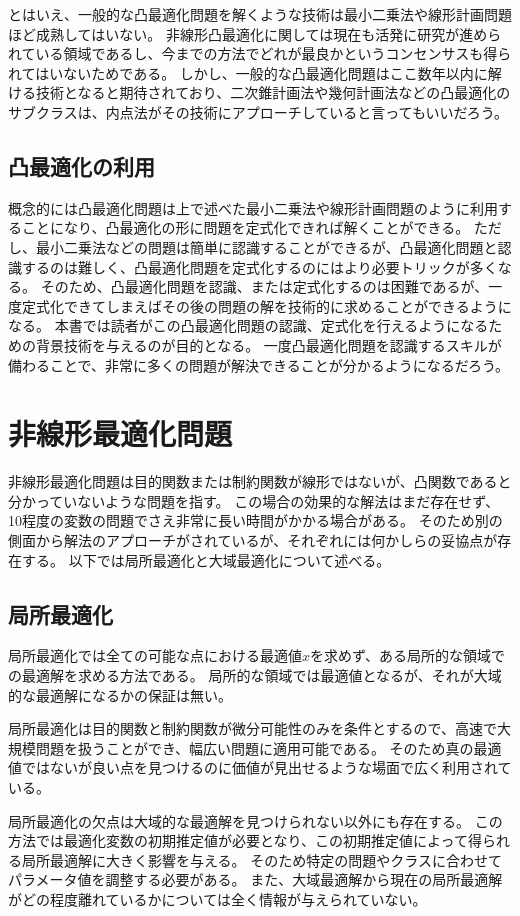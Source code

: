 \documentclass[a4paper, 10pt, uplatex]{jsreport}
\begin{document}
とはいえ、一般的な凸最適化問題を解くような技術は最小二乗法や線形計画問題ほど成熟してはいない。
非線形凸最適化に関しては現在も活発に研究が進められている領域であるし、今までの方法でどれが最良かというコンセンサスも得られてはいないためである。
しかし、一般的な凸最適化問題はここ数年以内に解ける技術となると期待されており、二次錐計画法や幾何計画法などの凸最適化のサブクラスは、内点法がその技術にアプローチしていると言ってもいいだろう。

\subsection{凸最適化の利用}
概念的には凸最適化問題は上で述べた最小二乗法や線形計画問題のように利用することになり、凸最適化の形に問題を定式化できれば解くことができる。
ただし、最小二乗法などの問題は簡単に認識することができるが、凸最適化問題と認識するのは難しく、凸最適化問題を定式化するのにはより必要トリックが多くなる。
そのため、凸最適化問題を認識、または定式化するのは困難であるが、一度定式化できてしまえばその後の問題の解を技術的に求めることができるようになる。
本書では読者がこの凸最適化問題の認識、定式化を行えるようになるための背景技術を与えるのが目的となる。
一度凸最適化問題を認識するスキルが備わることで、非常に多くの問題が解決できることが分かるようになるだろう。

\section{非線形最適化問題}
非線形最適化問題は目的関数または制約関数が線形ではないが、凸関数であると分かっていないような問題を指す。
この場合の効果的な解法はまだ存在せず、10程度の変数の問題でさえ非常に長い時間がかかる場合がある。
そのため別の側面から解法のアプローチがされているが、それぞれには何かしらの妥協点が存在する。
以下では局所最適化と大域最適化について述べる。

\subsection{局所最適化}
局所最適化では全ての可能な点における最適値$x$を求めず、ある局所的な領域での最適解を求める方法である。
局所的な領域では最適値となるが、それが大域的な最適解になるかの保証は無い。

局所最適化は目的関数と制約関数が微分可能性のみを条件とするので、高速で大規模問題を扱うことができ、幅広い問題に適用可能である。
そのため真の最適値ではないが良い点を見つけるのに価値が見出せるような場面で広く利用されている。

局所最適化の欠点は大域的な最適解を見つけられない以外にも存在する。
この方法では最適化変数の初期推定値が必要となり、この初期推定値によって得られる局所最適解に大きく影響を与える。
そのため特定の問題やクラスに合わせてパラメータ値を調整する必要がある。
また、大域最適解から現在の局所最適解がどの程度離れているかについては全く情報が与えられていない。
\end{document}
